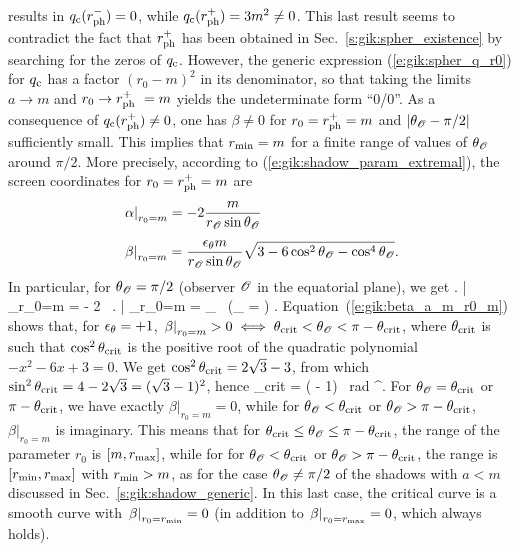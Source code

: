 results in $q_{\rm c}(r_{\rm ph}^-) = 0$, while $q_{\rm c}(r_{\rm ph}^+) = 3 m^2 \neq 0$.
This last result seems to contradict the fact that
$r_{\rm ph}^+$ has been
obtained in Sec.~\ref{s:gik:spher_existence} by searching for the zeros of $q_{\rm c}$.
However, the generic expression (\ref{e:gik:spher_q_r0}) for $q_{\rm c}$ has a factor $(r_0 - m)^2$
in its denominator, so that taking the limits $a\to m$ and $r_0\to r_{\rm ph}^+\ =  m$
yields the undeterminate form ``0/0''. As a consequence of $q_{\rm c}(r_{\rm ph}^+) \neq 0$,
one has $\beta\neq 0$ for $r_0 = r_{\rm ph}^+ = m$ and $|\theta_{\mathscr{O}} - \pi/2|$ sufficiently small.
This implies that $r_{\rm min} = m$ for a finite range of values of $\theta_{\mathscr{O}}$ around
$\pi/2$.
More precisely,
according to (\ref{e:gik:shadow_param_extremal}), the screen coordinates for $r_0 = r_{\rm ph}^+ = m$ are
\begin{subequations}
\label{e:gik:shadow_extremal_term}
\begin{align}
& \left. \alpha \right| _{r_0=m} =  - 2 \frac{m}{r_{\mathscr{O}}\sin\theta_{\mathscr{O}}}  \\[1ex]
& \left. \beta \right| _{r_0=m} = \frac{\epsilon_\theta m}{r_{\mathscr{O}} \sin\theta_{\mathscr{O}}}
        \sqrt{ 3 - 6 \cos^2\theta_{\mathscr{O}} - \cos^4\theta_{\mathscr{O}}} .  \label{e:gik:beta_a_m_r0_m}
\end{align}
\end{subequations}
In particular, for $\theta_{\mathscr{O}}=\pi/2$ (observer $\mathscr{O}$ in the equatorial plane), we get
\be \label{e:gik:shadow_extremal_term_equat}
    \left. \alpha \right| _{r_0=m}  = - 2 \, 
    \qand
    \left. \beta \right| _{r_0=m} = \eps_\th {} \,  \qquad
    \left(\th_{\Obs} =  \right) .
\ee
Equation~(\ref{e:gik:beta_a_m_r0_m}) shows that, for $\epsilon_\theta = +1$,
$\left. \beta \right| _{r_0=m} > 0 \iff \theta_{\rm crit} < \theta_{\mathscr{O}} < \pi - \theta_{\rm crit}$,
where $\theta_{\rm crit}$ is such that $\cos^2\theta_{\rm crit}$ is
the positive root of the quadratic polynomial $-x^2 - 6 x + 3 = 0$. We get
$\cos^2\theta_{\rm crit} = 2\sqrt{3} - 3$, from which $\sin^2\theta_{\rm crit} = 4 - 2\sqrt{3} = (\sqrt{3} - 1)^2$, hence
\be \label{e:gik:shadow_a1_th_crit}
    \th_{\rm crit} = \arcsin( - 1) \, {\rm rad} ^\circ .
\ee
For $\theta_{\mathscr{O}} = \theta_{\rm crit}$ or $\pi - \theta_{\rm crit}$, we have exactly $\left. \beta \right| _{r_0=m} = 0$,
while for $\theta_{\mathscr{O}} < \theta_{\rm crit}$ or $\theta_{\mathscr{O}} > \pi -  \theta_{\rm crit}$,
$\left. \beta \right| _{r_0=m}$ is imaginary. This means that
for $\theta_{\rm crit} \leq \theta_{\mathscr{O}} \leq \pi - \theta_{\rm crit}$, the range of the parameter $r_0$ is
$[m, r_{\rm max}]$, while for
for $\theta_{\mathscr{O}} < \theta_{\rm crit}$ or $\theta_{\mathscr{O}} > \pi -  \theta_{\rm crit}$,
the range is $[r_{\rm min}, r_{\rm max}]$ with $r_{\rm min} > m$, as for the case $\theta_{\mathscr{O}} \neq \pi/2$ of the shadows with $a < m$ discussed in Sec.~\ref{s:gik:shadow_generic}. In this last case,
the critical curve is a smooth curve with $\left. \beta \right| _{r_0=r_{\rm min}} = 0$ (in addition
to $\left. \beta \right| _{r_0=r_{\rm max}} = 0$, which always holds).

